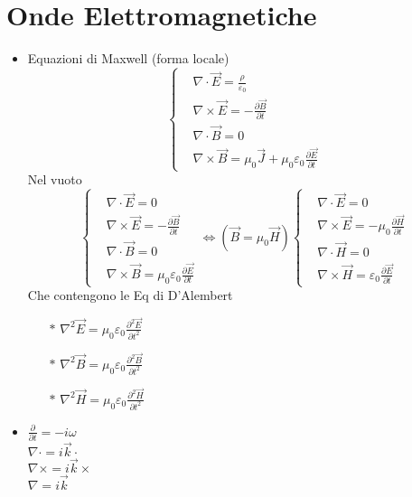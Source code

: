 \documentclass[a4paper]{article}
\begin{document}
\section{Onde Elettromagnetiche}
\begin{itemize}
	\item Equazioni di Maxwell (forma locale)
	\begin{equation*}
		\begin{cases}
			& \nabla \cdot \overrightarrow{E}=\frac{\rho}{\varepsilon_0}\\
			& \nabla \times \overrightarrow{E}=-\frac{\partial \overrightarrow{B}}{\partial t}\\
			& \nabla \cdot \overrightarrow{B} = 0\\
			& \nabla \times \overrightarrow{B} = \mu_0 \overrightarrow{J}+\mu_0\varepsilon_0\frac{\partial \overrightarrow{E}}{\partial t}
		\end{cases}
	\end{equation*} 
Nel vuoto 
\begin{equation*}
	\begin{cases}
		& \nabla \cdot \overrightarrow{E}=0\\
		& \nabla \times \overrightarrow{E}=-\frac{\partial \overrightarrow{B}}{\partial t}\\
		& \nabla \cdot \overrightarrow{B} = 0\\
		& \nabla \times \overrightarrow{B} =\mu_0\varepsilon_0\frac{\partial \overrightarrow{E}}{\partial t}
	\end{cases} \iff(\overrightarrow{B}=\mu_0\overrightarrow{H})
	\begin{cases}
		& \nabla \cdot \overrightarrow{E}=0\\
		& \nabla \times \overrightarrow{E}=-\mu_0\frac{\partial \overrightarrow{H}}{\partial t}\\
		& \nabla \cdot \overrightarrow{H} = 0\\
		& \nabla \times \overrightarrow{H} =\varepsilon_0\frac{\partial \overrightarrow{E}}{\partial t}
	\end{cases}
\end{equation*} 
Che contengono le Eq di D'Alembert
\begin{itemize}
	\item[$\ast$] $\nabla^2\overrightarrow{E}=\mu_0 \varepsilon_0 \frac{\partial^2 \overrightarrow{E}}{\partial t^2}$
	\item[$\ast$] $\nabla^2\overrightarrow{B}=\mu_0 \varepsilon_0 \frac{\partial^2 \overrightarrow{B}}{\partial t^2}$
	\item[$\ast$] $\nabla^2\overrightarrow{H}=\mu_0 \varepsilon_0 \frac{\partial^2 \overrightarrow{H}}{\partial t^2}$
\end{itemize}
\item $\frac{\partial}{\partial t} = - i \omega$\\
$\nabla \cdot = i \overrightarrow{k} \cdot$\\
$\nabla \times = i \overrightarrow{k} \times$\\
$\nabla  = i \overrightarrow{k}$\\



\end{itemize}
\end{document}
